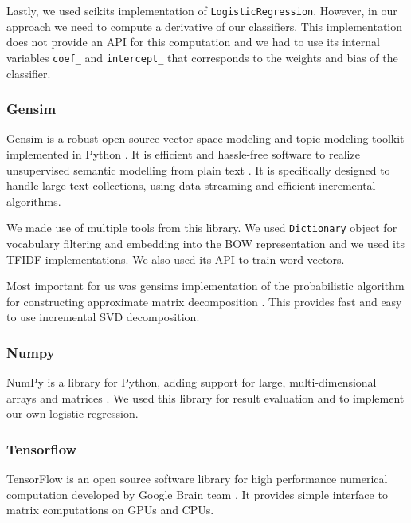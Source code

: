     Lastly, we used scikits implementation of \texttt{LogisticRegression}.
    However, in our approach we need to compute a derivative of our classifiers. 
    This implementation does not provide an API for this computation and we had to use
    its internal variables \texttt{coef\_} and \texttt{intercept\_} that corresponds to the weights and bias of the classifier.
    
    \subsubsection{Gensim}
    
    Gensim is a robust open-source vector space modeling and topic modeling toolkit implemented in Python \cite{rehurek_lrec}. 
    It is efficient and hassle-free software to realize unsupervised semantic modelling from plain text \cite{bird2009natural}. %
    It is specifically designed to handle large text collections, using data streaming and efficient incremental algorithms. 
    
    We made use of multiple tools from this library. 
    We used \texttt{Dictionary} object for vocabulary filtering and embedding into the BOW representation and we used its TFIDF implementations.
    We also used its API to train word vectors. 
    
    Most important for us was gensims implementation of the probabilistic algorithm for constructing approximate matrix decomposition \cite{halko2011finding}.
    This provides fast and easy to use incremental SVD decomposition.
    
    \subsubsection{Numpy}
    
    NumPy is a library for Python, adding support for large, multi-dimensional arrays and matrices \cite{oliphant2006guide}. %
    We used this library for result evaluation and to implement our own logistic regression.
    
    \subsubsection{Tensorflow}
    
    TensorFlow is an open source software library for high performance numerical computation developed by Google Brain team \cite{tensorflow2015-whitepaper}. 
    It provides simple interface to matrix computations on GPUs and CPUs.
    
